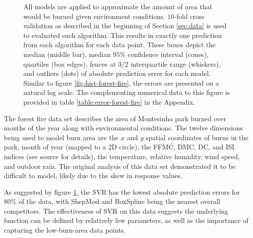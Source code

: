 \documentclass[smallextended,final]{svjour3}       %
\begin{document}
\begin{figure}
  \centering
  \caption{All models are applied to approximate the amount of area
    that would be burned given environment conditions. $10$-fold
    cross validation as described in the beginning of Section
    \ref{sec:data} is used to evaluated each algorithm. This results
    in exactly one prediction from each algorithm for each data
    point. These boxes depict the median (middle bar), median $95\%$
    confidence interval (cones), quartiles (box edges), fences at
    $3/2$ interquartile range (whiskers), and outliers (dots) of
    absolute prediction error for each model. Similar to figure
    \ref{fig:hist-forest-fire}, the errors are presented on a natural
    log scale. The complementing numerical data to this figure is
    provided in table \ref{table:error-forest-fire} in the Appendix.}
  \label{fig:error-forest-fire}
\end{figure}


The forest fire data set \cite{cortez2007data} describes the area of
Montesinho park burned over months of the year along with
environmental conditions. The twelve dimensions being used to model
burn area are the $x$ and $y$ spatial coordinates of burns in the
park, month of year (mapped to a 2D circle), the FFMC, DMC, DC, and
ISI indices (see source for details), the temperature, relative
humidity, wind speed, and outdoor rain. The original analysis of this
data set demonstrated it to be difficult to model, likely due to the
skew in response values.

As suggested by figure \ref{fig:error-forest-fire}, the SVR has the
lowest absolute prediction errors for 80\% of the data, with ShepMod
and BoxSpline being the nearest overall competitors. The effectiveness
of SVR on this data suggests the underlying function can be defined by
relatively few parameters, as well as the importance of capturing the
low-burn-area data points.
\end{document}
